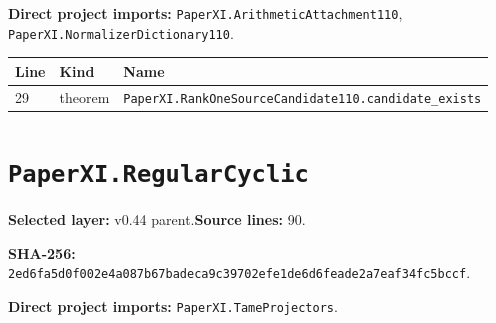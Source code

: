 \documentclass[10pt,oneside]{book}
\begin{document}

\textbf{Direct project imports:} \nolinkurl{PaperXI.ArithmeticAttachment110}, \nolinkurl{PaperXI.NormalizerDictionary110}.

\begin{longtable}{@{}p{}p{}p{}@{}}\toprule Line&Kind&Name\\\midrule\endhead

29&theorem&\nolinkurl{PaperXI.RankOneSourceCandidate110.candidate_exists}\\

\bottomrule\end{longtable}

\section{\texorpdfstring{\nolinkurl{PaperXI.RegularCyclic}}{PaperXI.RegularCyclic}}\label{module:PaperXI.RegularCyclic}

\textbf{Selected layer:} v0.44 parent.\quad\textbf{Source lines:} 90.\par\textbf{SHA-256:} {\scriptsize\nolinkurl{2ed6fa5d0f002e4a087b67badeca9c39702efe1de6d6feade2a7eaf34fc5bccf}}.


\textbf{Direct project imports:} \nolinkurl{PaperXI.TameProjectors}.
\end{document}
